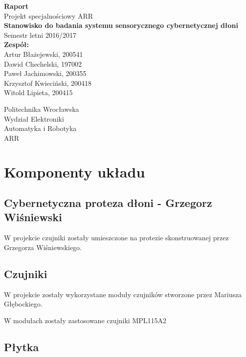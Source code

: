 \documentclass[a4paper,12pt]{article}
\begin{document}
\begin{titlepage}
\begin{center}
\vspace*{1cm}
{ \Large \textbf{ Raport }}\\[1cm]


{ \Large Projekt specjalnościowy ARR \\
\textbf{Stanowisko do badania systemu sensorycznego cybernetycznej dłoni}}\\
Semestr letni 2016/2017\\[2cm]

\Large{
\textbf{Zespół:}}\\
\large {Artur Błażejewski, 200541\\
Dawid Chechelski, 197002\\
Paweł Jachimowski, 200355\\
Krzysztof Kwieciński, 200418\\
Witold Lipieta, 200415}

\vfill
\Large
Politechnika Wrocławska\\
\large
Wydział Elektroniki\\
Automatyka i Robotyka\\
ARR
\end{center}
\end{titlepage}


	\section{Komponenty układu}
		\subsection{Cybernetyczna proteza dłoni - Grzegorz Wiśniewski}
			W projekcie czujniki zostały umieszczone na protezie skonstruowanej przez Grzegorza Wiśniewskiego. \cite{Reka}
		\subsection{Czujniki}
			W projekcie zostały wykorzystane moduły czujników stworzone przez Mariusza Głębockiego. \cite{Moduly}
			
			W modułach zostały zastosowane czujniki MPL115A2 \cite{MPL112A2}
			
		\subsection{Płytka}
			
\end{document}
